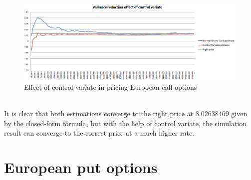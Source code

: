 \begin{figure}[h]
      \centering
	\includegraphics[scale=0.45]{controlVariateEuropeanCallDiagram.png}
      \caption{Effect of control variate in pricing European call options}
\end{figure}
\\
It is clear that both estimations converge to the right price at $8.02638469$ given by the closed-form formula, but with the help of control variate, the simulation result can converge to the correct price at a much higher rate.
\newpage

\section{European put options}

